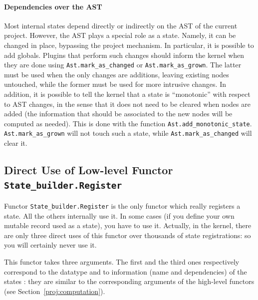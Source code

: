 \paragraph{Dependencies over the AST}

Most internal states depend directly or indirectly on the AST of the current
project. However, the AST plays a special role as a state. Namely, it can be
changed in place, bypassing the project mechanism. In particular, it is possible
to add globals. Plugins that perform such changes should inform the kernel
when they are done using
\texttt{Ast.mark\_as\_changed} or
\texttt{Ast.mark\_as\_grown}. The latter
must be used when the only changes are additions, leaving existing nodes
untouched, while the former must be used for more intrusive changes.
In addition, it is possible to tell the kernel that a state is ``monotonic''
with respect to AST changes, in the sense that it does not need to be cleared
when nodes are added (the information that should be associated to the new
nodes will be computed as needed). This is done with the function
\texttt{Ast.add\_monotonic\_state}.
\texttt{Ast.mark\_as\_grown} will not touch such a state, while
\texttt{Ast.mark\_as\_changed} will clear it.

\subsection{Direct Use of Low-level Functor \texttt{State\_builder.Register}}
\label{proj:lowlevel}

Functor \texttt{State\_builder.Register}%
 is the only functor which really
registers a state. All the others internally use it. In some cases (\eg if you
define your own mutable record used as a state), you have to use it. Actually,
in the \framac kernel, there are only three direct uses of this
functor over thousands of state registrations: so you will certainly never use
it.

This functor takes three arguments. The first and the third ones respectively
correspond to the datatype and to information (name and
dependencies) of the states%
: they are similar to the corresponding
arguments of the high-level functors (see Section~\ref{proj:computation}).

